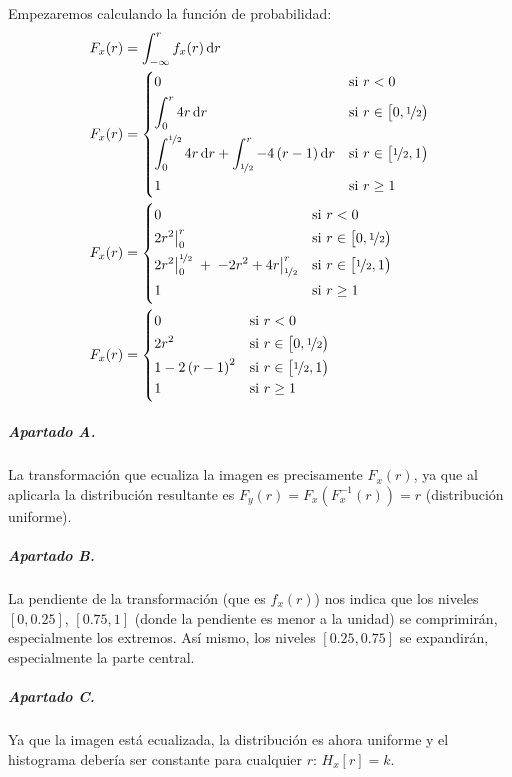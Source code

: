 Empezaremos calculando la función de probabilidad:
%
\begin{align*}
  F_x(r) &= \int_{-\infty}^r f_x(r) \dif r
\\
  F_x(r) &= \begin{dcases}
    0 & \text{si $r < 0$}
  \\
    \int_0^r 4r \dif r
        & \text{si $r \in \left[0, \nicefrac{1}{2}\right)$}
  \\
    \int_0^{\nicefrac{1}{2}} 4r \dif r + \int_{\nicefrac{1}{2}}^{r} -4\left(r-1\right) \dif r
        & \text{si $r \in \left[\nicefrac{1}{2}, 1\right)$}
  \\
    1 & \text{si $r \geq 1$}
  \end{dcases}
\\
  F_x(r) &= \begin{dcases}
    0 & \text{si $r < 0$}
  \\
    \bigl. 2 r^2 \bigr|_0^r
        & \text{si $r \in \left[0, \nicefrac{1}{2}\right)$}
  \\
    \bigl. 2 r^2 \bigr|_0^{\nicefrac{1}{2}} \; + \; \bigl. -2r^2 +4r\bigr|_{\nicefrac{1}{2}}^{r}
        & \text{si $r \in \left[\nicefrac{1}{2}, 1\right)$}
  \\
    1 & \text{si $r \geq 1$}
  \end{dcases}
\\
  F_x(r) &= \begin{dcases}
    0 & \text{si $r < 0$}
  \\
    2 r^2
        & \text{si $r \in \left[0, \nicefrac{1}{2}\right)$}
  \\
    1 - 2 \left(r-1\right)^2
        & \text{si $r \in \left[\nicefrac{1}{2}, 1\right)$}
  \\
    1 & \text{si $r \geq 1$}
  \end{dcases}
\end{align*}

\subparagraph{Apartado A.}

La transformación que ecualiza la imagen es precisamente $F_x(r)$, ya que
al aplicarla la distribución resultante es
$F_y(r) = F_x\left(F_x^{-1}(r)\right) = r$ (distribución uniforme).

\subparagraph{Apartado B.}

La pendiente de la transformación (que es $f_x(r)$) nos indica que los niveles
$\left[0, \num{0.25}\right]$, $\left[\num{0.75}, 1\right]$ (donde la pendiente
es menor a la unidad) se comprimirán, especialmente los extremos. Así mismo,
los niveles $\left[\num{0.25}, \num{0.75}\right]$ se expandirán, especialmente
la parte central.

\subparagraph{Apartado C.}

Ya que la imagen está ecualizada, la distribución es ahora uniforme y el
histograma debería ser constante para cualquier $r$: $H_x[r] = k$.


\finishpage

